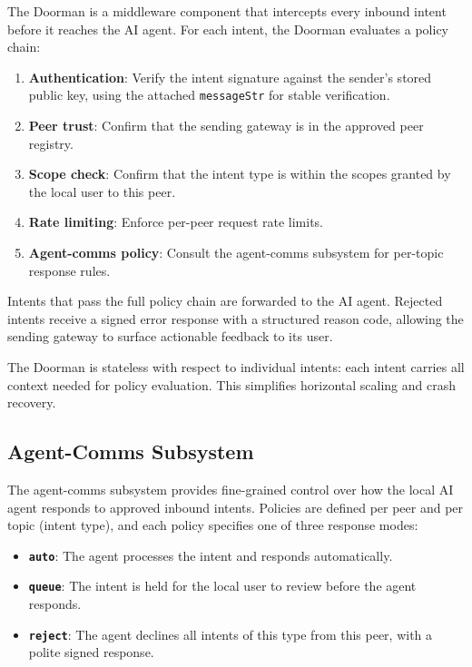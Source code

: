 \documentclass[conference]{IEEEtran}
\begin{document}
The Doorman is a middleware component that intercepts every inbound intent before it reaches the AI agent. For each intent, the Doorman evaluates a policy chain:

\begin{enumerate}
  \item \textbf{Authentication}: Verify the intent signature against the sender's stored public key, using the attached \texttt{messageStr} for stable verification.
  \item \textbf{Peer trust}: Confirm that the sending gateway is in the approved peer registry.
  \item \textbf{Scope check}: Confirm that the intent type is within the scopes granted by the local user to this peer.
  \item \textbf{Rate limiting}: Enforce per-peer request rate limits.
  \item \textbf{Agent-comms policy}: Consult the agent-comms subsystem for per-topic response rules.
\end{enumerate}

Intents that pass the full policy chain are forwarded to the AI agent. Rejected intents receive a signed error response with a structured reason code, allowing the sending gateway to surface actionable feedback to its user.

The Doorman is stateless with respect to individual intents: each intent carries all context needed for policy evaluation. This simplifies horizontal scaling and crash recovery.

\subsection{Agent-Comms Subsystem}

The agent-comms subsystem provides fine-grained control over how the local AI agent responds to approved inbound intents. Policies are defined per peer and per topic (intent type), and each policy specifies one of three response modes:

\begin{itemize}
  \item \textbf{\texttt{auto}}: The agent processes the intent and responds automatically.
  \item \textbf{\texttt{queue}}: The intent is held for the local user to review before the agent responds.
  \item \textbf{\texttt{reject}}: The agent declines all intents of this type from this peer, with a polite signed response.
\end{itemize}
\end{document}
